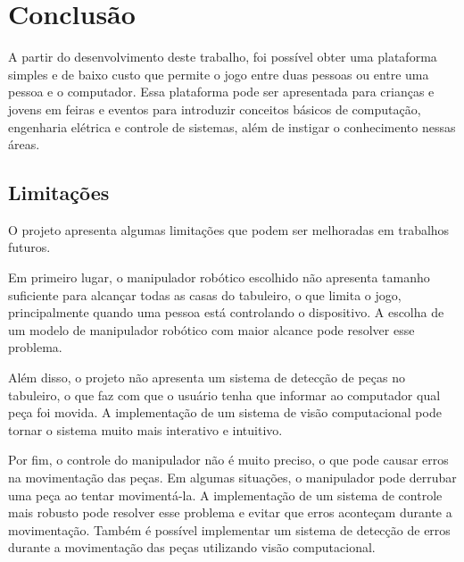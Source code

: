 \chapter[Conclusão]{Conclusão}
\label{cap:conclusao}

A partir do desenvolvimento deste trabalho, foi possível obter uma plataforma simples e de baixo custo que permite o jogo entre duas pessoas ou entre uma pessoa e o computador.
Essa plataforma pode ser apresentada para crianças e jovens em feiras e eventos para introduzir conceitos básicos de computação, engenharia elétrica e controle de sistemas, além de instigar o conhecimento nessas áreas.

\section[Limitações]{Limitações}
\label{sec:limitacoes}

O projeto apresenta algumas limitações que podem ser melhoradas em trabalhos futuros.

Em primeiro lugar, o manipulador robótico escolhido não apresenta tamanho suficiente para alcançar todas as casas do tabuleiro,
o que limita o jogo, principalmente quando uma pessoa está controlando o dispositivo.
A escolha de um modelo de manipulador robótico com maior alcance pode resolver esse problema.

Além disso, o projeto não apresenta um sistema de detecção de peças no tabuleiro,
o que faz com que o usuário tenha que informar ao computador qual peça foi movida.
A implementação de um sistema de visão computacional pode tornar o sistema muito mais interativo e intuitivo.

Por fim, o controle do manipulador não é muito preciso, o que pode causar erros na movimentação das peças.
Em algumas situações, o manipulador pode derrubar uma peça ao tentar movimentá-la.
A implementação de um sistema de controle mais robusto pode resolver esse problema e evitar que erros aconteçam durante a movimentação.
Também é possível implementar um sistema de detecção de erros durante a movimentação das peças utilizando visão computacional.